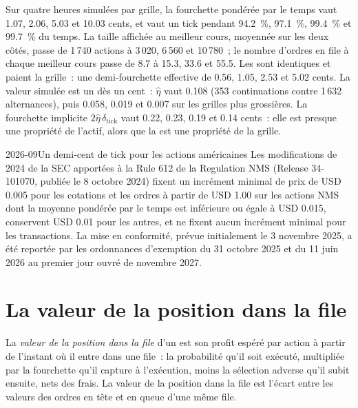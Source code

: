 Sur quatre heures simulées par grille, la fourchette pondérée par le temps vaut 1.07, 2.06, 5.03 et 10.03 cents, et vaut un tick pendant 94.2~\%, 97.1~\%, 99.4~\% et 99.7~\% du temps.
La taille affichée au meilleur cours, moyennée sur les deux côtés, passe de 1\,740 actions à 3\,020, 6\,560 et 10\,780~; le nombre d'ordres en file à chaque meilleur
cours passe de 8.7 à 15.3, 33.6 et 55.5. Les  sont identiques et paient la grille~: une demi-fourchette effective de 0.56, 1.05, 2.53 et 5.02 cents. La
valeur simulée est un  dès un cent~: $\hat\eta$ vaut 0.108 (353 continuations contre 1\,632 alternances), puis 0.058, 0.019 et 0.007
sur les grilles plus grossières. La fourchette implicite $2\hat\eta\,\delta_{\mathrm{tick}}$ vaut 0.22, 0.23, 0.19 et 0.14 cents~: elle est presque une propriété de l'actif, alors que
la  est une propriété de la grille.

\begin{dated}{2026-09}{Un demi-cent de tick pour les actions américaines}\label{dat:mx:tick-size-queues-and-priority:rule612}
Les modifications de 2024 de la SEC apportées à la Rule 612 de la Regulation NMS (Release 34-101070, publiée le 8 octobre 2024) fixent un incrément minimal de prix de USD 0.005
pour les cotations et les ordres à partir de USD 1.00 sur les actions NMS dont la  moyenne pondérée par le temps est inférieure ou égale à USD 0.015, conservent USD 0.01 pour
les autres, et ne fixent aucun incrément minimal pour les transactions. La mise en conformité, prévue initialement le 3 novembre 2025, a été reportée par les ordonnances d'exemption du 31 octobre 2025 et du 11 juin 2026 au
premier jour ouvré de novembre 2027.
\end{dated}

\section{La valeur de la position dans la file}

\begin{definition}\label{def:mx:tick-size-queues-and-priority:queuevalue}
La \emph{valeur de la position dans la file} d'un  est son profit espéré par action à partir de l'instant où il entre dans une file~: la probabilité
qu'il soit exécuté, multipliée par la fourchette qu'il capture à l'exécution, moins la sélection adverse qu'il subit ensuite, nets des frais. La valeur de la position dans la file est l'écart
entre les valeurs des ordres en tête et en queue d'une même file.
\end{definition}

